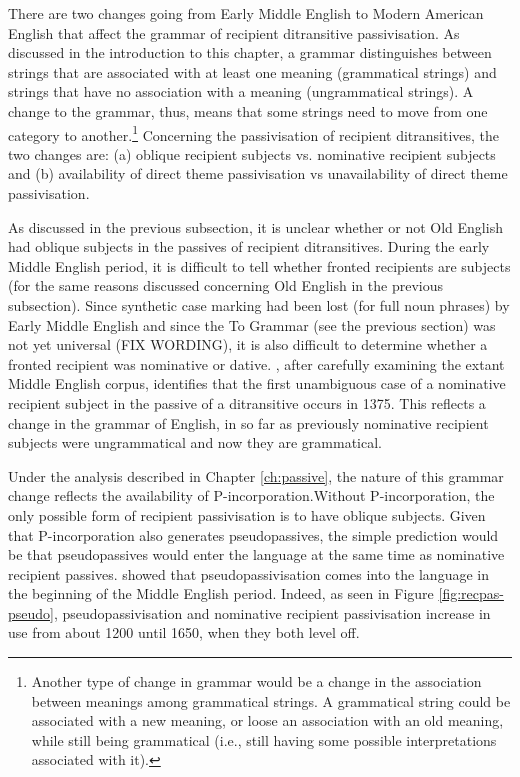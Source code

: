 	There are two changes going from Early Middle English to Modern American English that affect the grammar of recipient ditransitive passivisation. As discussed in the introduction to this chapter, a grammar distinguishes between strings that are associated with at least one meaning (grammatical strings) and strings that have no association with a meaning (ungrammatical strings). A change to the grammar, thus, means that some strings need to move from one category to another.\footnote{Another type of change in grammar would be a change in the association between meanings among grammatical strings. A grammatical string could be associated with a new meaning, or loose an association with an old meaning, while still being grammatical (i.e., still having some possible interpretations associated with it).} Concerning the passivisation of recipient ditransitives, the two changes are: (a) oblique recipient subjects vs. nominative recipient subjects and (b) availability of direct theme passivisation vs unavailability of direct theme passivisation. 

	As discussed in the previous subsection, it is unclear whether or not Old English had oblique subjects in the passives of recipient ditransitives. During the early Middle English period, it is difficult to tell whether fronted recipients are subjects (for the same reasons discussed concerning Old English in the previous subsection). Since synthetic case marking had been lost (for full noun phrases) by Early Middle English and since the To Grammar (see the previous section) was not yet universal (FIX WORDING), it is also difficult to determine whether a fronted recipient was nominative or dative. \cite{Allen.1999}, after carefully examining the extant Middle English corpus, identifies that the first unambiguous case of a nominative recipient subject in the passive of a ditransitive occurs in 1375. This reflects a change in the grammar of English, in so far as previously nominative recipient subjects were ungrammatical and now they are grammatical.

	Under the analysis described in Chapter \ref{ch:passive}, the nature of this grammar change reflects the availability of P-incorporation.Without P-incorporation, the only possible form of recipient passivisation is to have oblique subjects. Given that P-incorporation also generates pseudopassives, the simple prediction would be that pseudopassives would enter the language at the same time as nominative recipient passives. \cite{Sigursson.2014} showed that pseudopassivisation comes into the language in the beginning of the Middle English period. Indeed, as seen in Figure \ref{fig:recpas-pseudo}, pseudopassivisation and nominative recipient passivisation increase in use from about 1200 until 1650, when they both level off.

